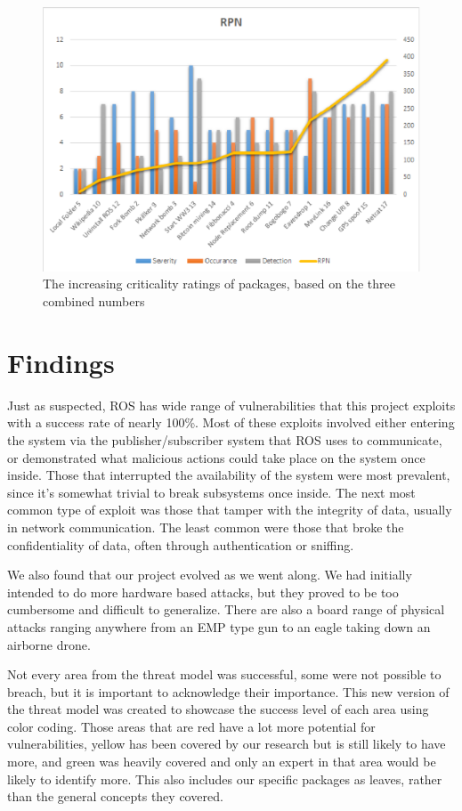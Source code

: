 \documentclass[IEEEtran,letterpaper,10pt,notitlepage,draftclsnofoot]{article}
\begin{document}
\begin{figure}[H]
    \centering
    \includegraphics[width=\textwidth]{RPN.eps}
    \caption{The increasing criticality ratings of packages, based on the three combined numbers}
\end{figure}

\section{Findings}
Just as suspected, ROS has wide range of vulnerabilities that this project exploits with a success rate of nearly 100\%.
Most of these exploits involved either entering the system via the publisher/subscriber system that ROS uses to communicate, or demonstrated what malicious actions could take place on the system once inside.
Those that interrupted the availability of the system were most prevalent, since it's somewhat trivial to break subsystems once inside.
The next most common type of exploit was those that tamper with the integrity of data, usually in network communication.
The least common were those that broke the confidentiality of data, often through authentication or sniffing.

We also found that our project evolved as we went along.
We had initially intended to do more hardware based attacks, but they proved to be too cumbersome and difficult to generalize.
There are also a board range of physical attacks ranging anywhere from an EMP type gun to an eagle taking down an airborne drone.

Not every area from the threat model was successful, some were not possible to breach, but it is important to acknowledge their importance.
This new version of the threat model was created to showcase the success level of each area using color coding.
Those areas that are red have a lot more potential for vulnerabilities, yellow has been covered by our research but is still likely to have more, and green was heavily covered and only an expert in that area would be likely to identify more.
This also includes our specific packages as leaves, rather than the general concepts they covered.
\end{document}
